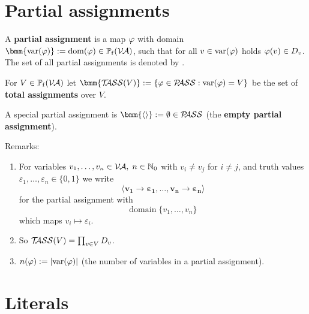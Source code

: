 \documentclass[]{book}
\begin{document}
\section{Partial assignments}
\label{sec:Partialassignments}

\begin{defi}\label{def:Pass}
      A \textbf{partial assignment} is a map $\varphi$ with domain $\bmm{\var(\vp)} := \dom(\vp) \in \pote(\Va)$, such that for all $v \in \operatorname{var}(\varphi)$ holds $\varphi(v) \in D_v$. 
	  The set of all partial assignments is denoted by \bmm{\Pass}.

      For $V \in \operatorname{\mathbb{P}_f}(\mathcal{V\hspace{-0.1em}A})$ let $\bmm{\Tass(V)} := \set{\vp \in \Pass : \var(\vp) = V}$ be the set of \textbf{total assignments} over $V$.

      A special partial assignment is $\bmm{\epa} := \es \in \Pass$ (the \textbf{empty partial assignment}).
\end{defi}
Remarks:
\begin{enumerate}
      \item For variables $v_1, \ldots, v_n \in \mathcal{V\hspace{-0.1em}A}, \; n\in \mathbb{N}_0$ with $v_i \neq v_j$ for $i\neq j$, and truth values $\varepsilon_1, \ldots, \varepsilon_n \in \{0,1\}$ we write
      \begin{displaymath}
            \pmb{\langle v_1 \to \varepsilon_1, \ldots, v_n \to \varepsilon_n\rangle}
      \end{displaymath}
      for the partial assignment with
      \begin{displaymath}
            \mbox{domain} \; \{v_1, \ldots, v_n\}
      \end{displaymath}
      which maps $v_i \mapsto \varepsilon_i$.
      \item So $\mathcal{T\hspace{-0.35em}ASS}(V) = \prod_{v \in V} D_v$.
      \item $n(\varphi) := \lvert \operatorname{var}(\varphi)  \rvert$ (the number of variables in a partial assignment).
\end{enumerate}

\section{Literals}
\label{sec:Litsvar}
\end{document}
